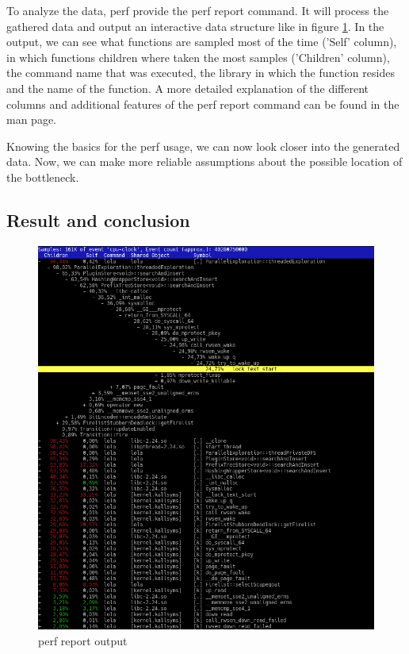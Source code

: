 To analyze the data, perf provide the perf report command. It will process the gathered data and output an interactive data structure like in figure \ref{perf_record_sample}. In the output, we can see what functions are sampled most of the time ('Self' column), in which functions children where taken the most samples ('Children' column), the command name that was executed, the library in which the function resides and the name of the function. A more detailed explanation of the different columns and additional features of the perf report command can be found in the man page.

Knowing the basics for the perf usage, we can now look closer into the generated data. Now, we can make more reliable assumptions about the possible location of the bottleneck.

\subsection{Result and conclusion}
\label{first_perf_results}
\begin{figure}
    \centering
    \includegraphics[width=\textwidth]{pictures/perfReportSample.png}
    \caption{perf report output}
    \label{perf_record_sample}
\end{figure}
